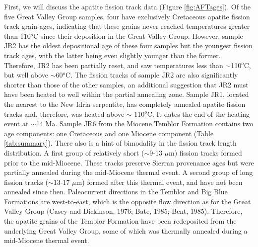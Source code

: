 \documentclass[11pt,twoside]{article}
\begin{document}
First,  we  will  discuss  the  apatite  fission  track  data  (Figure
\ref{fig:AFTages}). Of the five  Great Valley Group samples, four have
exclusively  Cretaceous apatite  fission track  grain-ages, indicating
that  these grains  never reached  temperatures greater  than 110$^o$C
since their deposition in the Great Valley Group.  However, sample JR2
has the oldest depositional age of these four samples but the youngest
fission track ages,  with the latter being even  slightly younger than
the  former.   Therefore,  JR2  has  been  partially  reset,  and  saw
temperatures less  than $\sim$110$^o$C, but  well above $\sim$60$^o$C.
The fission tracks  of sample JR2 are also  significantly shorter than
those of  the other  samples, an additional  suggestion that  JR2 must
have been  heated to well  within the partial annealing  zone.  Sample
JR1, located the  nearest to the New Idria  serpentite, has completely
annealed  apatite  fission tracks  and,  therefore,  was heated  above
$\sim$ 110$^o$C.   It dates the end  of the heating  event at $\sim$14
Ma.  Sample  JR6 from the  Miocene Temblor Formation contains  two age
components:   one  Cretaceous   and  one   Miocene   component  (Table
\ref{tab:summary}).  There also is a hint of bimodality in the fission
track  length  distribution.   A   first  group  of  relatively  short
($\sim$9-13 $\mu$m)  fission tracks  formed prior to  the mid-Miocene.
These  tracks  preserve Sierran  provenance  ages  but were  partially
annealed during the mid-Miocene thermal event.  A second group of long
fission tracks  ($\sim$13-17 $\mu$m) formed after  this thermal event,
and have not been annealed since then.  Paleocurrent directions in the
Temblor  and  Big  Blue  Formations  are west-to-east,  which  is  the
opposite  flow direction  as for  the  Great Valley  Group (Casey  and
Dickinson,  1976; Bate,  1985;  Bent, 1985).   Therefore, the  apatite
grains  of  the  Temblor  Formation  have been  redeposited  from  the
underlying Great  Valley Group, some  of which was  thermally annealed
during a mid-Miocene thermal event.\\
\end{document}
